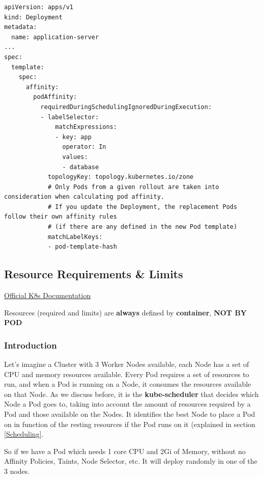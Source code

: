\documentclass{article}
\newenvironment{blocktemplateIII}[1]{%
    \tcolorbox[beamer,%
    noparskip,breakable,
    ,colframe=Red,%
    colbacklower=LimeGreen!75!LightGreen,%
    title=#1]}%
    {\endtcolorbox}
\newenvironment{codetemplate}[1][]{%
  \mybasecolorbox[#1]
  \itshape
}{%
  \endmybasecolorbox
}
\begin{document}
\begin{codetemplate}{}
\begin{verbatim}
apiVersion: apps/v1
kind: Deployment
metadata:
  name: application-server
...
spec:
  template:
    spec:
      affinity:
        podAffinity:
          requiredDuringSchedulingIgnoredDuringExecution:
          - labelSelector:
              matchExpressions:
              - key: app
                operator: In
                values:
                - database
            topologyKey: topology.kubernetes.io/zone
            # Only Pods from a given rollout are taken into consideration when calculating pod affinity.
            # If you update the Deployment, the replacement Pods follow their own affinity rules
            # (if there are any defined in the new Pod template)
            matchLabelKeys:
            - pod-template-hash
\end{verbatim}
\end{codetemplate}

\subsection{Resource Requirements \& Limits}

\href{https://kubernetes.io/docs/concepts/configuration/manage-resources-containers/}{Official K8s Documentation}

\begin{blocktemplateIII}{WARNING}
Resources (required and limits) are \textbf{always} defined by \textbf{container}, \textbf{NOT BY POD}
\end{blocktemplateIII}

\subsubsection{Introduction}
Let's imagine a Cluster with 3 Worker Nodes available, each Node has a set of CPU and memory resources available. Every Pod requires a set of resources to run, and when a Pod is running on a Node, it consumes the resources available on that Node. As we discuss before, it is the \textbf{kube-scheduler} that decides which Node a Pod goes to, taking into account the amount of resources required by a Pod and those available on the Nodes. It identifies the best Node to place a Pod on in function of the resting resources if the Pod runs on it (explained in section \ref{Scheduling}.

So if we have a Pod which needs 1 core CPU and 2Gi of Memory, without no Affinity Policies, Taints, Node Selector, etc. It will deploy randomly in one of the 3 nodes. 
\end{document}
